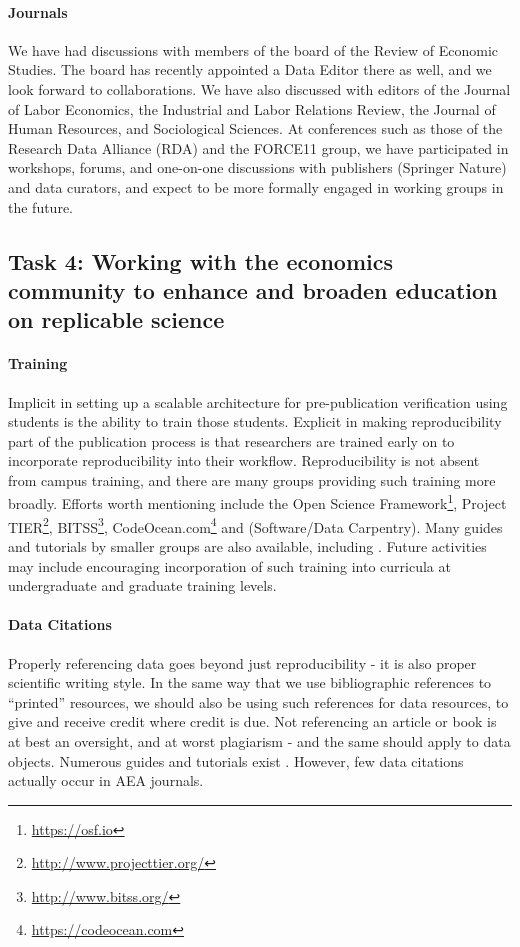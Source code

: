 \documentclass[AEJ]{AEA}
\newcommand{\urlcite}[2]{#2\footnote{\url{#1}}}
\begin{document}
\paragraph{Journals} We have had discussions with members of the board of the Review of Economic Studies. The board has recently appointed a Data Editor there as well, and we look forward to collaborations. We have also discussed with editors of the Journal of Labor Economics, the Industrial and Labor Relations Review, the Journal of Human Resources, and Sociological Sciences. At conferences such as those of the Research Data Alliance (RDA) and the FORCE11 group, we have participated in workshops, forums, and one-on-one discussions with publishers (Springer Nature) and data curators, and expect to be more formally engaged in working groups in the future. 

\subsection{Task 4: Working with the economics community to enhance and broaden education on replicable science}

\paragraph{Training}

Implicit in setting up a scalable architecture for pre-publication verification using students is the ability to train those students. Explicit in making reproducibility part of the publication process is that researchers are trained early on to incorporate reproducibility into their workflow. Reproducibility is not absent from campus training, and there are many groups providing such training more broadly. Efforts worth mentioning include the  \urlcite{https://osf.io}{Open Science Framework}, \urlcite{http://www.projecttier.org/}{Project TIER}, \urlcite{http://www.bitss.org/}{BITSS}, \urlcite{https://codeocean.com}{CodeOcean.com} and (Software/Data Carpentry). Many guides and tutorials by smaller groups are also available, including \cite{Gentzkow2014,Wilson2016-bt,Vilhuber2018}. Future activities may include encouraging incorporation of such training into curricula at undergraduate and graduate training levels. 




\paragraph{Data Citations}
Properly referencing data goes beyond just reproducibility - it is also proper scientific writing style. In the same way that we use bibliographic references to ``printed'' resources, we should also be using such references for data resources, to give and receive credit where credit is due. Not referencing an article or book is at best an oversight, and at worst plagiarism - and the same should apply to data objects. Numerous guides and tutorials exist  \citep{dataone-l09,icpsr-data-cite,force11declaration}. However, few data citations actually occur in AEA journals.
\end{document}
